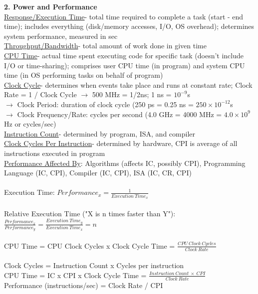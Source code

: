 \documentclass{article}
\begin{document}
\textbf{2. Power and Performance}\\
\underline{Response/Execution Time}- total time required to complete a task
(start - end time); includes everything (disk/memory accesses, I/O, OS
overhead); determines system performance, measured in sec \\
\underline{Throughput/Bandwidth}- total amount of work done in given time\\
\underline{CPU Time}- actual time spent executing code for specific task
(doesn't include I/O or time-sharing); comprises user CPU time (in program) and
system CPU time (in OS performing tasks on behalf of program) \\
\underline{Clock Cycle}- determines when events take place and runs at constant
rate; Clock Rate = 1 / Clock Cycle $\rightarrow$ 500 MHz = 1/2ns; 1 ns =
$10^{-9}$s\\
$\rightarrow$ Clock Period: duration of clock cycle (250 ps = 0.25 ns =
$250\times10^{-12}$s \\
$\rightarrow$ Clock Frequency/Rate: cycles per second (4.0 GHz = 4000 MHz =
$4.0\times10^{9}$Hz or cycles/sec) \\
\underline{Instruction Count}- determined by program, ISA, and compiler \\
\underline{Clock Cycles Per Instruction}- determined by hardware, CPI is average
of all instructions executed in program \\
\underline{Performance Affected By}: Algorithms (affects IC, possibly CPI),
Programming Language (IC, CPI), Compiler (IC, CPI), ISA (IC, CR, CPI) \\ \\
Execution Time:
$Performance_{x} = \frac{1}{Execution\ Time_{x}}$ \\ \\
Relative Execution Time ("X is n times faster than Y"):
$\frac{Performance_{x}}{Performance_{y}} = \frac{Execution\ Time_{y}}{Execution\
Time_{x}} = n$ \\ \\
CPU Time = CPU Clock Cycles x Clock Cycle Time = $\frac{CPU\ Clock\
Cycles}{Clock\ Rate}$ \\ \\
Clock Cycles = Instruction Count x Cycles per instruction \\
CPU Time = IC x CPI x Clock Cycle Time = $\frac{Instruction\ Count\ \times\
CPI}{Clock\ Rate}$ \\ 
Performance (instructions/sec) = Clock Rate / CPI \\ \\
\end{document}
